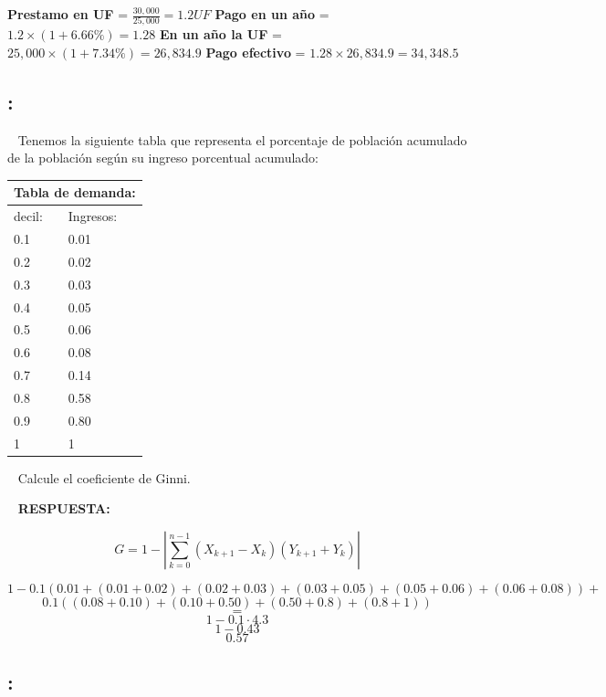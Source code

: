 \documentclass[
  letterpaper,
  DIV=11,
  numbers=noendperiod]{scrreport}
\begin{document}
\textbf{Prestamo en UF} = \(\frac{30,000}{25,000} = 1.2 UF\)
\textbf{Pago en un año} = \(1.2\times(1 + 6.66 \%) = 1.28\) \textbf{En
un año la UF} = \(25,000\times(1 + 7.34 \%) = 26,834.9\) \textbf{Pago
efectivo} = \(1.28\times26,834.9 = 34,348.5\)

\hypertarget{section-24}{%
\subsection{:}\label{section-24}}

~ Tenemos la siguiente tabla que representa el porcentaje de población
acumulado de la población según su ingreso porcentual acumulado:

\begin{table}[H]
    \centering
    \begin{tabular}{|p{25mm}|p{25mm}|}
        \multicolumn{2}{c}{Tabla de demanda:} \\
        \hline
        decil: & Ingresos: \\ \hline
        0.1 & 0.01 \\ \hline
        0.2 & 0.02 \\ \hline
        0.3 & 0.03 \\ \hline
        0.4 & 0.05 \\ \hline
        0.5 & 0.06 \\ \hline
        0.6 & 0.08 \\ \hline
        0.7 & 0.14 \\ \hline
        0.8 & 0.58 \\ \hline
        0.9 & 0.80 \\ \hline
        1 & 1 \\ \hline
        \end{tabular}
\end{table}

~ Calcule el coeficiente de Ginni.

~ \textbf{RESPUESTA:}

\[G=1-\left|\sum_{k=0}^{n-1}\left(X_{k+1}-X_k\right)\left(Y_{k+1}+Y_k\right)\right| \]

\[1-0.1(0.01+(0.01+0.02)+(0.02+0.03)+(0.03+0.05)+(0.05+0.06)+(0.06+0.08))+\]
\[0.1((0.08+0.10)+(0.10+0.50)+(0.50+0.8)+(0.8+1))\] \[=\]
\[1-0.1\cdot 4.3\] \[1-0.43\] \[0.57\]

\hypertarget{section-25}{%
\subsection{:}\label{section-25}}
\end{document}
